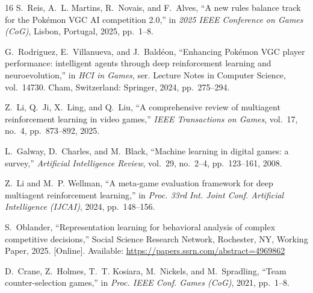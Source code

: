 \documentclass[conference]{IEEEtran}
\begin{document}
\begin{thebibliography}{16}
S.~Reis, A.~L. Martins, R.~Novais, and F.~Alves, ``A new rules balance track for the Pok\'emon VGC AI competition 2.0,''
in \emph{2025 IEEE Conference on Games (CoG)}, Lisbon, Portugal, 2025, pp.~1--8.

G.~Rodriguez, E.~Villanueva, and J.~Bald\'eon, ``Enhancing Pok\'emon VGC player performance: intelligent agents through deep reinforcement learning and neuroevolution,''
in \emph{HCI in Games}, ser. Lecture Notes in Computer Science, vol.~14730. Cham, Switzerland: Springer, 2024, pp.~275--294.

Z.~Li, Q.~Ji, X.~Ling, and Q.~Liu, ``A comprehensive review of multiagent reinforcement learning in video games,''
\emph{IEEE Transactions on Games}, vol.~17, no.~4, pp.~873--892, 2025.

L.~Galway, D.~Charles, and M.~Black, ``Machine learning in digital games: a survey,''
\emph{Artificial Intelligence Review}, vol.~29, no.~2--4, pp.~123--161, 2008.

Z.~Li and M.~P. Wellman, ``A meta-game evaluation framework for deep multiagent reinforcement learning,''
in \emph{Proc. 33rd Int. Joint Conf. Artificial Intelligence (IJCAI)}, 2024, pp.~148--156.

S.~Oblander, ``Representation learning for behavioral analysis of complex competitive decisions,''
Social Science Research Network, Rochester, NY, Working Paper, 2025. [Online]. Available: \url{https://papers.ssrn.com/abstract=4969862}

D.~Crane, Z.~Holmes, T.~T. Kosiara, M.~Nickels, and M.~Spradling,
``Team counter-selection games,'' in \emph{Proc. IEEE Conf. Games (CoG)}, 2021, pp.~1--8.

\end{thebibliography}
\vspace{12pt}
\end{document}
